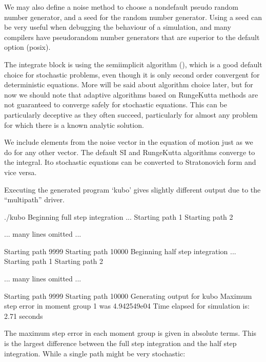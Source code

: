 \documentclass[letterpaper,10pt,english]{sphinxmanual}
\begin{document}
\sphinxAtStartPar
We may also define a noise method to choose a non\sphinxhyphen{}default pseudo random number generator, and a seed for the random number generator.  Using a seed can be very useful when debugging the behaviour of a simulation, and many compilers have pseudo\sphinxhyphen{}random number generators that are superior to the default option (posix).

\sphinxAtStartPar
The integrate block is using the semi\sphinxhyphen{}implicit algorithm (), which is a good default choice for stochastic problems, even though it is only second order convergent for deterministic equations.  More will be said about algorithm choice later, but for now we should note that adaptive algorithms based on Runge\sphinxhyphen{}Kutta methods are not guaranteed to converge safely for stochastic equations.  This can be particularly deceptive as they often succeed, particularly for almost any problem for which there is a known analytic solution.

\sphinxAtStartPar
We include elements from the noise vector in the equation of motion just as we do for any other vector.  The default SI and Runge\sphinxhyphen{}Kutta algorithms converge to the  integral.  Ito stochastic equations can be converted to Stratonovich form and vice versa.

\sphinxAtStartPar
Executing the generated program ‘kubo’ gives slightly different output due to the “multi\sphinxhyphen{}path” driver.

\begin{sphinxVerbatim}[commandchars=\\\{\}]
\PYGZdl{} ./kubo
Beginning full step integration ...
Starting path 1
Starting path 2

... many lines omitted ...

Starting path 9999
Starting path 10000
Beginning half step integration ...
Starting path 1
Starting path 2

... many lines omitted ...

Starting path 9999
Starting path 10000
Generating output for kubo
Maximum step error in moment group 1 was 4.942549e\PYGZhy{}04
Time elapsed for simulation is: 2.71 seconds
\end{sphinxVerbatim}

\sphinxAtStartPar
The maximum step error in each moment group is given in absolute terms.  This is the largest difference between the full step integration and the half step integration.  While a single path might be very stochastic:
\end{document}
